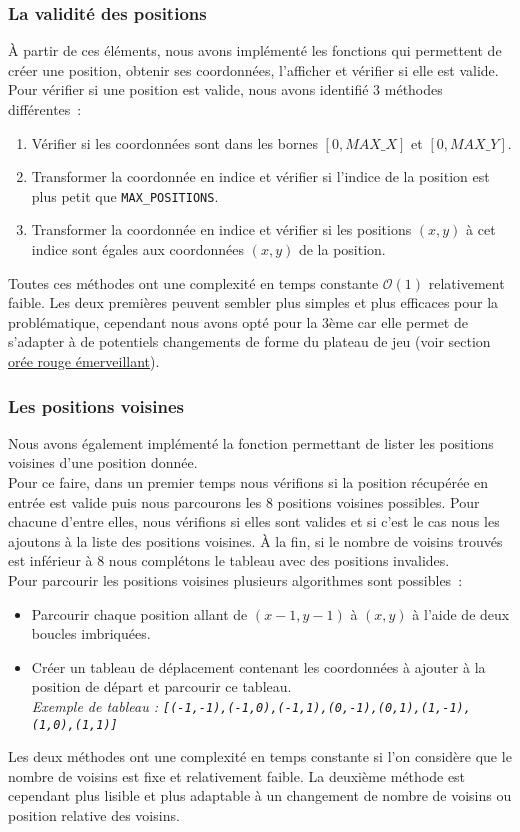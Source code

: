 \subsubsection{La validité des positions}
À partir de ces éléments, nous avons implémenté les fonctions qui permettent de créer une position, obtenir ses coordonnées, l'afficher et vérifier si elle est valide. Pour vérifier si une position est valide, nous avons identifié 3 méthodes différentes~:
\begin{enumerate}
    \item Vérifier si les coordonnées sont dans les bornes \([0,MAX\_X]\) et \([0,MAX\_Y]\).
    \item Transformer la coordonnée en indice et vérifier si l'indice de la position est plus petit que \texttt{MAX\_POSITIONS}.
    \item Transformer la coordonnée en indice et vérifier si les positions \((x,y)\) à cet indice sont égales aux coordonnées \((x,y)\) de la position.
\end{enumerate}
Toutes ces méthodes ont une complexité en temps constante \(\mathcal{O}(1)\) relativement faible.
Les deux premières peuvent sembler plus simples et plus efficaces pour la problématique, cependant nous avons opté pour la 3ème car elle permet de s'adapter à de potentiels changements de forme du plateau de jeu (voir section \hyperref[sec:ore]{\uline{orée rouge émerveillant}}).
\subsubsection{Les positions voisines}
Nous avons également implémenté la fonction permettant de lister les positions voisines d'une position donnée.\\
Pour ce faire, dans un premier temps nous vérifions si la position récupérée en entrée est valide puis nous parcourons les 8 positions voisines possibles.
Pour chacune d'entre elles, nous vérifions si elles sont valides et si c'est le cas nous les ajoutons à la liste des positions voisines.
À la fin, si le nombre de voisins trouvés est inférieur à 8 nous complétons le tableau avec des positions invalides.\\
Pour parcourir les positions voisines plusieurs algorithmes sont possibles~:
\begin{itemize}
    \item Parcourir chaque position allant de \((x-1,y-1)\) à \((x,y)\) à l'aide de deux boucles imbriquées.
    \item Créer un tableau de déplacement contenant les coordonnées à ajouter à la position de départ et parcourir ce tableau. \\ \textit{Exemple de tableau : \texttt{[(-1,-1),(-1,0),(-1,1),(0,-1),(0,1),(1,-1),(1,0),(1,1)]}}
\end{itemize}
Les deux méthodes ont une complexité en temps constante si l'on considère que le nombre de voisins est fixe et relativement faible.
La deuxième méthode est cependant plus lisible et plus adaptable à un changement de nombre de voisins ou position relative des voisins.
